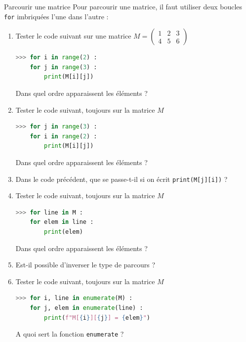 \documentclass[a4paper,11pt]{article}
\begin{document}
\begin{ExerciceNomme}{Parcourir une matrice}
Pour parcourir une matrice, il faut utiliser deux boucles \texttt{for} imbriquées l'une dans l'autre :
\begin{enumerate}
\item Tester le code suivant sur une matrice $M = \begin{pmatrix}
1&2&3\\
4&5&6                                                                                                                                        \end{pmatrix}$ 
\begin{lstlisting}[language=python, caption = {parcours ligne}]
>>> for i in range(2) :
	for j in range(3) :
		print(M[i][j])
\end{lstlisting}
Dans quel ordre apparaissent les éléments ? 


\item Tester le code suivant, toujours sur la matrice $M$
\begin{lstlisting}[language=python, caption = {parcours colonnes}]
>>> for j in range(3) :
	for i in range(2) :
		print(M[i][j])
\end{lstlisting}
Dans quel ordre apparaissent les éléments ? 
\item Dans le code précédent, que se passe-t-il si on écrit \texttt{print(M[j][i])} ? 
\item Tester le code suivant, toujours sur la matrice $M$
\begin{lstlisting}[language=python, caption = {foreach}]
>>> for line in M :
	for elem in line :
		print(elem)
\end{lstlisting}
Dans quel ordre apparaissent les éléments ? 
\item Est-il possible d'inverser le type de parcours ?
\item Tester le code suivant, toujours sur la matrice $M$
\begin{lstlisting}[language=python, caption = {foreach et enumerate}]
>>> for i, line in enumerate(M) :
	for j, elem in enumerate(line) :
		print(f"M[{i}][{j}] = {elem}")
\end{lstlisting}
A quoi sert la fonction \texttt{enumerate} ?
\end{enumerate}
\end{ExerciceNomme}
\end{document}
